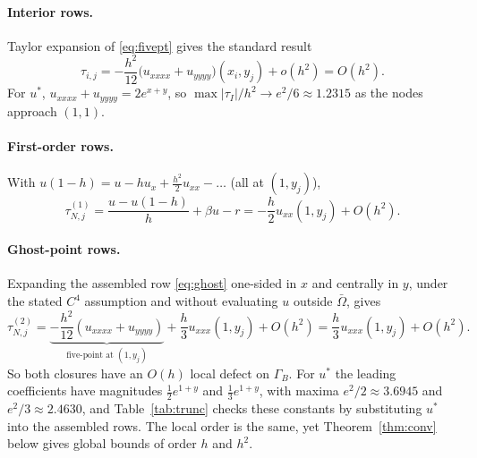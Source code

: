 \documentclass[11pt,a4paper]{article}
\theoremstyle{palplain}
\theoremstyle{paldef}
\theoremstyle{palremark}
\newcommand{\GB}{\Gamma_B}
\begin{document}
\paragraph{Interior rows.} Taylor expansion of \eqref{eq:fivept} gives the standard result \cite{leveque}
\begin{equation}\label{eq:tauI}
\tau_{i,j}=-\frac{h^2}{12}\bigl(u_{xxxx}+u_{yyyy}\bigr)(x_i,y_j)+o(h^2)=O(h^2).
\end{equation}
For $u^*$, $u_{xxxx}+u_{yyyy}=2e^{x+y}$, so $\max|\tau_I|/h^2\to e^2/6\approx1.2315$
as the nodes approach $(1,1)$.

\paragraph{First-order rows.} With $u(1-h)=u-hu_x+\tfrac{h^2}2u_{xx}-\dots$ (all at $(1,y_j)$),
\begin{equation}\label{eq:tauB1}
\tau^{(1)}_{N,j}=\frac{u-u(1-h)}{h}+\beta u-r=-\frac h2u_{xx}(1,y_j)+O(h^2).
\end{equation}

\paragraph{Ghost-point rows.} Expanding the assembled row \eqref{eq:ghost} one-sided in $x$
and centrally in $y$, under the stated $C^4$ assumption and without evaluating $u$ outside
$\bar\Omega$, gives
\begin{equation}\label{eq:tauB2}
\tau^{(2)}_{N,j}=\underbrace{-\frac{h^2}{12}(u_{xxxx}+u_{yyyy})}_{\text{five-point at }(1,y_j)}
+\frac h3u_{xxx}(1,y_j)+O(h^2)=\frac h3u_{xxx}(1,y_j)+O(h^2).
\end{equation}
So both closures have an $O(h)$ local defect on $\GB$. For $u^*$ the leading coefficients
have magnitudes $\tfrac12e^{1+y}$ and $\tfrac13e^{1+y}$, with maxima $e^2/2\approx3.6945$ and
$e^2/3\approx2.4630$, and Table~\ref{tab:trunc} checks these constants by substituting $u^*$
into the assembled rows. The local order is the same, yet Theorem~\ref{thm:conv} below gives
global bounds of order $h$ and $h^2$.
\end{document}
